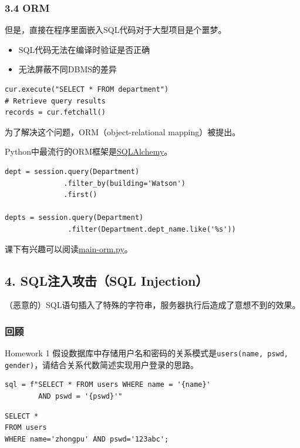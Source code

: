 \documentclass[aspectratio=169, 14pt]{beamer}
\begin{document}
\begin{frame}[fragile]
    \frametitle{3.4 ORM}
但是，直接在程序里面嵌入SQL代码对于大型项目是个噩梦。

\begin{itemize}
    \item SQL代码无法在编译时验证是否正确
    \item 无法屏蔽不同DBMS的差异
\end{itemize}
    


\begin{verbatim}
cur.execute("SELECT * FROM department")
# Retrieve query results
records = cur.fetchall()
\end{verbatim}

为了解决这个问题，ORM（object-relational mapping）被提出。
\end{frame}

\begin{frame}[fragile]
Python中最流行的ORM框架是\href{https://www.sqlalchemy.org/}{SQLAlchemy}。


\begin{verbatim}
dept = session.query(Department)
              .filter_by(building='Watson')
              .first()

depts = session.query(Department)
               .filter(Department.dept_name.like('%s'))
\end{verbatim}

课下有兴趣可以阅读\href{https://github.com/ChenZhongPu/db-swufe/blob/master/10_advanced/python-orm/main-orm.py}{main-orm.py}。
\end{frame}

\begin{frame}[fragile]
    \section{\textcolor{darkmidnightblue}{4. SQL注入攻击（SQL Injection）}}
    （恶意的）SQL语句插入了特殊的字符串，服务器执行后造成了意想不到的效果。
\end{frame}

\begin{frame}[fragile]
    \frametitle{回顾}
\begin{exampleblock}{Homework 1}
假设数据库中存储用户名和密码的关系模式是\texttt{users(name, pswd, gender)}，请结合关系代数简述实现用户登录的思路。
\end{exampleblock}

\begin{verbatim}
sql = f"SELECT * FROM users WHERE name = '{name}'
        AND pswd = '{pswd}'"
\end{verbatim}

\begin{verbatim}
SELECT *
FROM users
WHERE name='zhongpu' AND pswd='123abc';
\end{verbatim}

\end{frame}
\end{document}
